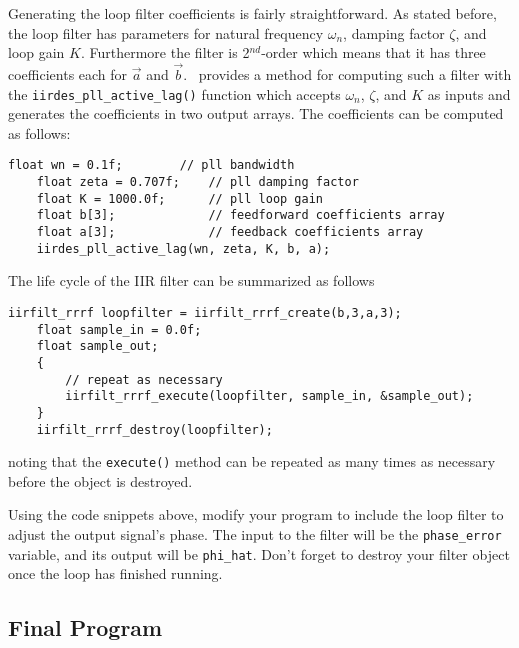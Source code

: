 Generating the loop filter coefficients is fairly straightforward.
As stated before, the loop filter has parameters for
natural frequency $\omega_n$,
damping factor $\zeta$, and
loop gain $K$.
Furthermore the filter is 2$^{nd}$-order which means that it has three
coefficients each for $\vec{a}$ and $\vec{b}$.
\liquid\ provides a method for computing such a filter with the
{\tt iirdes\_pll\_active\_lag()} function
which accepts $\omega_n$, $\zeta$, and $K$ as inputs and generates the
coefficients in two output arrays.
The coefficients can be computed as follows:
%
\begin{Verbatim}[fontsize=\small]
    float wn = 0.1f;        // pll bandwidth
    float zeta = 0.707f;    // pll damping factor
    float K = 1000.0f;      // pll loop gain
    float b[3];             // feedforward coefficients array
    float a[3];             // feedback coefficients array
    iirdes_pll_active_lag(wn, zeta, K, b, a);
\end{Verbatim}
%
The life cycle of the IIR filter can be summarized as follows
%
\begin{Verbatim}[fontsize=\small]
    iirfilt_rrrf loopfilter = iirfilt_rrrf_create(b,3,a,3);
    float sample_in = 0.0f;
    float sample_out;
    {
        // repeat as necessary
        iirfilt_rrrf_execute(loopfilter, sample_in, &sample_out);
    }
    iirfilt_rrrf_destroy(loopfilter);
\end{Verbatim}
%
noting that the {\tt execute()} method can be repeated as many times as
necessary before the object is destroyed.

Using the code snippets above, modify your program to include the loop
filter to adjust the output signal's phase.
The input to the filter will be the {\tt phase\_error} variable, and its
output will be {\tt phi\_hat}.
Don't forget to destroy your filter object once the loop has finished
running.

\subsection{Final Program}
\label{tutorial:pll:completed}

